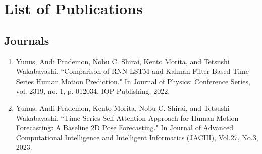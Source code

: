 
\chapter*{List of Publications} %


\ifpdf
    \graphicspath{{7/figures/PNG/}{7/figures/PDF/}{7/figures/}}
\else
    \graphicspath{{7/figures/EPS/}{7/figures/}}
\fi


\section*{Journals}
\begin{enumerate}
    \item Yunus, Andi Prademon, Nobu C. Shirai, Kento Morita, and Tetsushi Wakabayashi. ``Comparison of RNN-LSTM and Kalman Filter Based Time Series Human Motion Prediction." In Journal of Physics: Conference Series, vol. 2319, no. 1, p. 012034. IOP Publishing, 2022.
    \item Yunus, Andi Prademon, Kento Morita, Nobu C. Shirai, and Tetsushi Wakabayashi. ``Time Series Self-Attention Approach for Human Motion Forecasting: A Baseline 2D Pose Forecasting." In Journal of Advanced Computational Intelligence and Intelligent Informatics (JACIII), Vol.27, No.3, 2023.
\end{enumerate}


